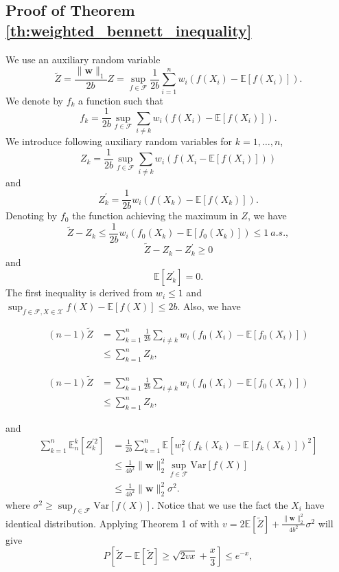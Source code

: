 \documentclass[letterpaper]{article} %
\def\DoubleColumn{}
\def\DoubleColumnEnd{}
\def\SingleColumn{}
\def\SingleColumnEnd{}
\newcommand{\E}{\mathbb{E}}
\newcommand{\Pro}{P}
\newcommand{\Var}{\text{Var}}
\newcommand{\weight}{\mathbf{w}}
\newcommand{\normo}[1]{\|#1\|_1}
\begin{document}
\subsection{Proof of Theorem \ref{th:weighted_bennett_inequality}} %
\label{sub:proof_of_theorem_th:weighted_bennett_inequality}

    We use an auxiliary random variable
    \[\widetilde{Z}=\frac{\normo{\weight{}}}{2b}Z=\sup_{f\in\mathcal{F}}\frac{1}{2b}\sum_{i=1}^nw_i\allowbreak(f(X_i)-\E[f(X_i)]).\]
    We denote by $f_k$ a function such that
    \[f_k = \frac{1}{2b}\sup_{f\in\mathcal F} \sum_{i\neq k}w_i(f(X_i)-\E[f(X_i)]).\]
    We introduce following auxiliary random variables for $k=1,\dots,n$,
    \[Z_k = \frac{1}{2b}\sup_{f\in\mathcal F} \sum_{i\neq k}w_i(f(X_i-\E[f(X_i)]))\]
    and
    \[Z_k^\prime = \frac{1}{2b}w_i(f(X_k)-\E[f(X_k)]).\]
    Denoting by $f_0$ the function achieving the maximum in $Z$, we have
    \[\widetilde{Z}-Z_k\le \frac{1}{2b}w_i(f_0(X_k)-\E[f_0(X_k)])\le 1\ a.s.,\]
    \[\widetilde{Z}-Z_k-Z_k^\prime\ge 0\]
    and
    \[\E[Z_k^\prime] = 0.\]
    The first inequality is derived from $w_i\le 1$ and $\sup_{f\in\mathcal{F}, X\in\mathcal{X}} f(X)-\E[f(X)]\le 2b$.
    Also, we have
    \DoubleColumn
    \begin{align*}
        (n-1)\widetilde{Z} &= \sum_{k=1}^n\frac{1}{2b}\sum_{i\neq k}w_i(f_0(X_i)-\E[f_0(X_i)])\\
        &\le \sum_{k=1}^n Z_k,
    \end{align*}
    \DoubleColumnEnd
    \SingleColumn
    \begin{align*}
        (n-1)\widetilde{Z} &= \sum_{k=1}^n\frac{1}{2b}\sum_{i\neq k}w_i(f_0(X_i)-\E[f_0(X_i)])\\
        &\le \sum_{k=1}^n Z_k,
    \end{align*}
    \SingleColumnEnd
    and
    \begin{align*}
        \sum_{k=1}^n \E_n^k[Z_k^{\prime2}] &= \frac{1}{2b}\sum_{k=1}^n \E[w_i^2(f_k(X_k)-\E[f_k(X_k)])^2]\\
        &\le \frac{1}{4b^2}\|\weight{}\|_2^2\sup_{f\in\mathcal F}\Var[f(X)]\\
        &\le \frac{1}{4b^2}\|\weight{}\|_2^2\sigma^2.
    \end{align*}
    where $\sigma^2\ge \sup_{f\in\mathcal F}\Var[f(X)]$.
    Notice that we use the fact the $X_i$ have identical distribution.
    Applying Theorem 1 of \cite{Bousquet2002a} with $v=2\E[\widetilde{Z}]+\frac{\|\weight{}\|_2^2}{4b^2}\sigma^2$ will give
    \[\Pro[\widetilde{Z}-\E[\widetilde{Z}]\ge \sqrt{2vx}+\frac{x}{3}]\le e^{-x},\]
\end{document}
